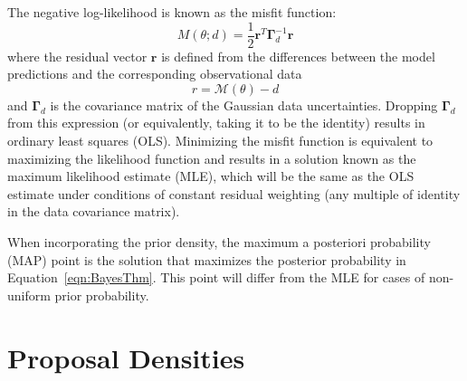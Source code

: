 The negative log-likelihood is known as the misfit function:
\begin{equation}
  M\left( {\theta ;d} \right) = \frac{1}{2} 
  \boldsymbol{r}^T \boldsymbol{\Gamma}_d^{-1} \boldsymbol{r} %
\end{equation}
where the residual vector $\boldsymbol{r}$ is defined from the
differences between the model predictions and the corresponding
observational data
\begin{equation}
r = \mathcal{M}(\theta) - d
\end{equation}
and $\boldsymbol{\Gamma}_d$ is the covariance matrix of the Gaussian data
uncertainties.  Dropping $\boldsymbol{\Gamma}_d$ from this expression (or
equivalently, taking it to be the identity) results in ordinary least
squares (OLS).  Minimizing the misfit function is equivalent to
maximizing the likelihood function and results in a solution known as the
maximum likelihood estimate (MLE), which will be the same as the OLS
estimate under conditions of constant residual weighting (any multiple
of identity in the data covariance matrix).

When incorporating the prior density, the maximum a posteriori
probability (MAP) point is the solution that maximizes the posterior
probability in Equation~\ref{eqn:BayesThm}.  This point will differ
from the MLE for cases of non-uniform prior probability.


\section{Proposal Densities} \label{uq:bayes:prop}

